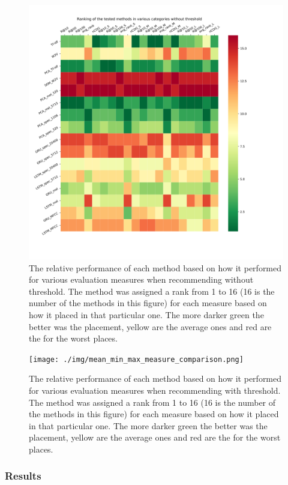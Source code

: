 \begin{figure}[h!]
    \centering
	\includegraphics[width=140mm]{./img/no_threshold_method_ranking.png}
	\caption{The relative performance of each method based on how it performed for various evaluation measures when recommending without threshold. The method was assigned a rank from 1 to 16 (16 is the number of the methods in this figure) for each measure based on how it placed in that particular one. The more darker green the better was the placement, yellow are the average ones and red are the for the worst places.}
	\label{fig:no_threshol_method_comparison}
\end{figure}
\begin{figure}[h!]
    \centering
	\texttt{[image: ./img/mean\_min\_max\_measure\_comparison.png]}
	\caption{The relative performance of each method based on how it performed for various evaluation measures when recommending with threshold. The method was assigned a rank from 1 to 16 (16 is the number of the methods in this figure) for each measure based on how it placed in that particular one. The more darker green the better was the placement, yellow are the average ones and red are the for the worst places.}
	\label{fig:threshold_method_comparison}
\end{figure}
\subsubsection{Results}

